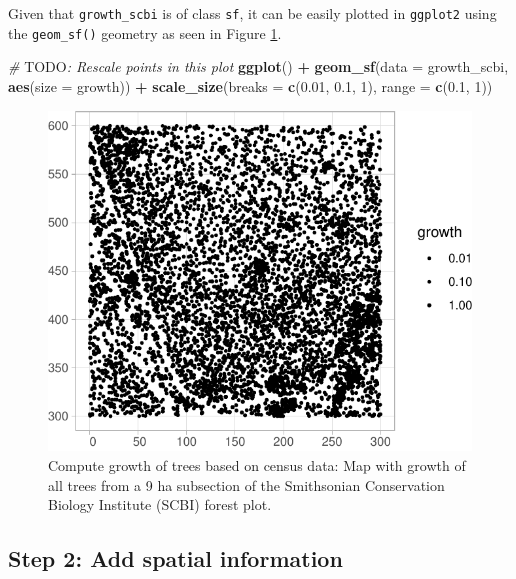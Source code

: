 \documentclass[12pt]{article}
\newenvironment{Shaded}{\begin{snugshade}}{\end{snugshade}}
\newcommand{\AlertTok}[1]{\textcolor[rgb]{0.94,0.16,0.16}{#1}}
\newcommand{\CommentTok}[1]{\textcolor[rgb]{0.56,0.35,0.01}{\textit{#1}}}
\newcommand{\DataTypeTok}[1]{\textcolor[rgb]{0.13,0.29,0.53}{#1}}
\newcommand{\DecValTok}[1]{\textcolor[rgb]{0.00,0.00,0.81}{#1}}
\newcommand{\FloatTok}[1]{\textcolor[rgb]{0.00,0.00,0.81}{#1}}
\newcommand{\KeywordTok}[1]{\textcolor[rgb]{0.13,0.29,0.53}{\textbf{#1}}}
\newcommand{\NormalTok}[1]{#1}
\newcommand{\OperatorTok}[1]{\textcolor[rgb]{0.81,0.36,0.00}{\textbf{#1}}}
\newcommand{\StringTok}[1]{\textcolor[rgb]{0.31,0.60,0.02}{#1}}
\begin{document}
Given that \texttt{growth\_scbi} is of class \texttt{sf}, it can be
easily plotted in \texttt{ggplot2} using the \texttt{geom\_sf()}
geometry as seen in Figure \ref{fig:scbi-trees}.

\begin{Shaded}
\begin{Highlighting}[]
\CommentTok{# }\AlertTok{TODO}\CommentTok{: Rescale points in this plot}
\KeywordTok{ggplot}\NormalTok{() }\OperatorTok{+}
\StringTok{  }\KeywordTok{geom_sf}\NormalTok{(}\DataTypeTok{data =}\NormalTok{ growth_scbi, }\KeywordTok{aes}\NormalTok{(}\DataTypeTok{size =}\NormalTok{ growth)) }\OperatorTok{+}\StringTok{ }
\StringTok{  }\KeywordTok{scale_size}\NormalTok{(}\DataTypeTok{breaks =} \KeywordTok{c}\NormalTok{(}\FloatTok{0.01}\NormalTok{, }\FloatTok{0.1}\NormalTok{, }\DecValTok{1}\NormalTok{), }\DataTypeTok{range =} \KeywordTok{c}\NormalTok{(}\FloatTok{0.1}\NormalTok{, }\DecValTok{1}\NormalTok{))}
\end{Highlighting}
\end{Shaded}

\begin{figure}

{\centering \includegraphics[width=0.66\linewidth]{Figures/scbi-trees-1} 

}

\caption{Compute growth of trees based on census data: Map with growth of all trees from a 9 ha subsection of the Smithsonian Conservation Biology Institute (SCBI) forest plot.}\label{fig:scbi-trees}
\end{figure}

\hypertarget{spatial-information}{%
\subsection{Step 2: Add spatial information}\label{spatial-information}}
\end{document}
